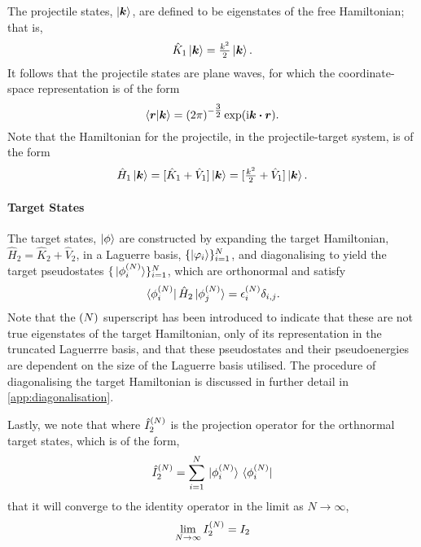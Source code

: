 \documentclass[draft]{article}
\begin{document}
The projectile states, $\ket{\boldsymbol{k}}$, are defined to be eigenstates of
the free Hamiltonian; that is,
\begin{equation}
  \label{eq:projectile-free-hamiltonian}
  \hat{K}_{1}
  \ket{\boldsymbol{k}}
  =
  \tfrac{k^{2}}{2}
  \ket{\boldsymbol{k}}
  .
\end{equation}
It follows that the projectile states are plane waves, for which the
coordinate-space representation is of the form
\begin{equation}
  \label{eq:projectile-states}
  \bra{\boldsymbol{r}}
  \ket{\boldsymbol{k}}
  =
  \lr{2 \pi}^{-\tfrac{3}{2}}
  \exponential\lr
  {
    \imath
    \boldsymbol{k}
    \vdot
    \boldsymbol{r}
  }
  .
\end{equation}
Note that the Hamiltonian for the projectile, in the projectile-target system,
is of the form
\begin{equation}
  \label{eq:projectile-hamiltonian}
  \hat{H}_{1}
  \ket{\boldsymbol{k}}
  =
  [
    \hat{K}_{1}
    +
    \hat{V}_{1}
  ]
  \ket{\boldsymbol{k}}
  =
  [
    \tfrac{k^{2}}{2}
    +
    \hat{V}_{1}
  ]
  \ket{\boldsymbol{k}}
  .
\end{equation}

\paragraph{Target States}

The target states, $\ket{\phi}$ are constructed by expanding the target
Hamiltonian, $\hat{H}_{2} = \hat{K}_{2} + \hat{V}_{2}$,
in a Laguerre basis, $\lbrace\ket{\varphi_{i}}\rbrace_{i = 1}^{N}$, and diagonalising
to yield the target pseudostates
$\lbrace\ket*{\phi_{i}^{(N)}}\rbrace_{i = 1}^{N}$, which are orthonormal and satisfy
\begin{equation}
  \label{eq:target-hamiltonian}
  \bra*{\phi_{i}^{(N)}}
  \hat{H}_{2}
  \ket*{\phi_{j}^{(N)}}
  =
  \epsilon_{i}^{(N)}
  \delta_{i, j}
  .
\end{equation}
Note that the $(N)$ superscript has been introduced to indicate that these
are not true eigenstates of the target Hamiltonian, only of its representation
in the truncated Laguerrre basis, and that these pseudostates and their
pseudoenergies are dependent on the size of the Laguerre basis utilised.
The procedure of diagonalising the target Hamiltonian is discussed in further
detail in \autoref{app:diagonalisation}.

Lastly, we note that where $\hat{I}_{2}^{(N)}$ is the projection operator for
the orthnormal target states, which is of the form,
\begin{equation}
  \label{eq:target-projection}
  \hat{I}_{2}^{(N)}
  =
  \sum_{i = 1}^{N}
  \ket*{\phi_{i}^{(N)}}
  \bra*{\phi_{i}^{(N)}}
\end{equation}
that it will converge to the identity operator in the limit as $N \to \infty$,
\begin{equation}
  \label{eq:target-projection-convergence}
  \lim_{N \to \infty}
  I_{2}^{(N)}
  =
  I_{2}
\end{equation}
\end{document}
